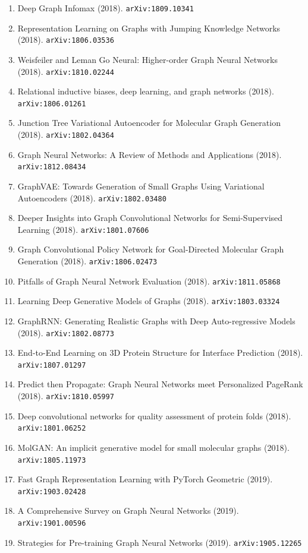 \documentclass[11pt]{article}
\begin{document}
\begin{enumerate}
  \item Deep Graph Infomax (2018). \texttt{arXiv:1809.10341}
  \item Representation Learning on Graphs with Jumping Knowledge Networks (2018). \texttt{arXiv:1806.03536}
  \item Weisfeiler and Leman Go Neural: Higher-order Graph Neural Networks (2018). \texttt{arXiv:1810.02244}
  \item Relational inductive biases, deep learning, and graph networks (2018). \texttt{arXiv:1806.01261}
  \item Junction Tree Variational Autoencoder for Molecular Graph Generation (2018). \texttt{arXiv:1802.04364}
  \item Graph Neural Networks: A Review of Methods and Applications (2018). \texttt{arXiv:1812.08434}
  \item GraphVAE: Towards Generation of Small Graphs Using Variational
  Autoencoders (2018). \texttt{arXiv:1802.03480}
  \item Deeper Insights into Graph Convolutional Networks for Semi-Supervised
  Learning (2018). \texttt{arXiv:1801.07606}
  \item Graph Convolutional Policy Network for Goal-Directed Molecular Graph
  Generation (2018). \texttt{arXiv:1806.02473}
  \item Pitfalls of Graph Neural Network Evaluation (2018). \texttt{arXiv:1811.05868}
  \item Learning Deep Generative Models of Graphs (2018). \texttt{arXiv:1803.03324}
  \item GraphRNN: Generating Realistic Graphs with Deep Auto-regressive Models (2018). \texttt{arXiv:1802.08773}
  \item End-to-End Learning on 3D Protein Structure for Interface Prediction (2018). \texttt{arXiv:1807.01297}
  \item Predict then Propagate: Graph Neural Networks meet Personalized PageRank (2018). \texttt{arXiv:1810.05997}
  \item Deep convolutional networks for quality assessment of protein folds (2018). \texttt{arXiv:1801.06252}
  \item MolGAN: An implicit generative model for small molecular graphs (2018). \texttt{arXiv:1805.11973}
  \item Fast Graph Representation Learning with PyTorch Geometric (2019). \texttt{arXiv:1903.02428}
  \item A Comprehensive Survey on Graph Neural Networks (2019). \texttt{arXiv:1901.00596}
  \item Strategies for Pre-training Graph Neural Networks (2019). \texttt{arXiv:1905.12265}

\end{enumerate}
\end{document}
